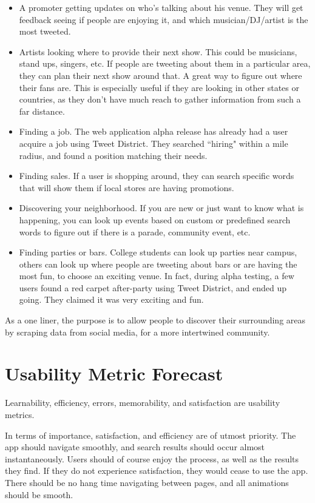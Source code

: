 \documentclass[11pt]{article}
\begin{document}
\begin{itemize}
\item A promoter getting updates on who's talking about his venue. They will get feedback seeing if people are enjoying it, and which musician/DJ/artist is the most tweeted.
\item Artists looking where to provide their next show. This could be musicians, stand ups, singers, etc. If people are tweeting about them in a particular area, they can plan their next show around that. A great way to figure out where their fans are. This is especially useful if they are looking in other states or countries, as they don't have much reach to gather information from such a far distance.
\item Finding a job. The web application alpha release has already had a user acquire a job using Tweet District. They searched ``hiring" within a mile radius, and found a position matching their needs.
\item Finding sales. If a user is shopping around, they can search specific words that will show them if local stores are having promotions.
\item Discovering your neighborhood. If you are new or just want to know what is happening, you can look up events based on custom or predefined search words to figure out if there is a parade, community event, etc.
\item Finding parties or bars. College students can look up parties near campus, others can look up where people are tweeting about bars or are having the most fun, to choose an exciting venue. In fact, during alpha testing, a few users found a red carpet after-party using Tweet District, and ended up going. They claimed it was very exciting and fun.
\end{itemize}

As a one liner, the purpose is to allow people to discover their surrounding areas by scraping data from social media, for a more intertwined community.

\section{Usability Metric Forecast}
Learnability, efficiency, errors, memorability, and satisfaction are usability metrics. 

In terms of importance, satisfaction, and efficiency are of utmost priority. The app should navigate smoothly, and search results should occur almost instantaneously. Users should of course enjoy the process, as well as the results they find. If they do not experience satisfaction, they would cease to use the app. There should be no hang time navigating between pages, and all animations should be smooth. 
\end{document}

